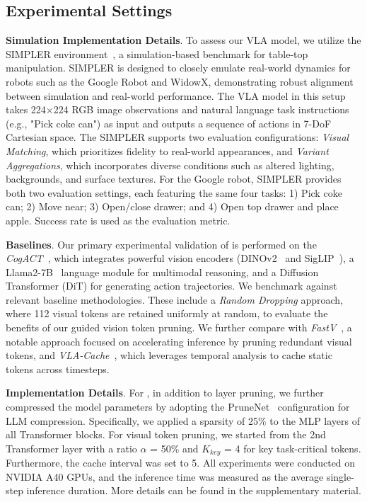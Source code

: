 \subsection{Experimental Settings}
\label{sec:setting}
\noindent \textbf{Simulation Implementation Details}.
To assess our VLA model, we utilize the SIMPLER environment~\citep{li2024evaluating}, a simulation-based benchmark for table-top manipulation. SIMPLER is designed to closely emulate real-world dynamics for robots such as the Google Robot and WidowX, demonstrating robust alignment between simulation and real-world performance.
The VLA model in this setup takes 224$\times$224 RGB image observations and natural language task instructions (e.g., "Pick coke can") as input and outputs a sequence of actions in 7-DoF Cartesian space.
The SIMPLER supports two evaluation configurations: \emph{Visual Matching}, which prioritizes fidelity to real-world appearances, and \emph{Variant Aggregations}, which incorporates diverse conditions such as altered lighting, backgrounds, and surface textures. For the Google robot, SIMPLER provides both two evaluation settings, each featuring the same four tasks: 1) Pick coke can; 2) Move near; 3) Open/close drawer; and 4) Open top drawer and place apple. Success rate is used as the evaluation metric.

\noindent \textbf{Baselines}. Our primary experimental validation of \mymethod{} is performed on the \emph{CogACT}~\citep{li2024cogactfoundationalvisionlanguageactionmodel}, which integrates powerful vision encoders (DINOv2~\citep{oquab2023dinov2} and SigLIP~\citep{zhai2023sigmoid}), a Llama2-7B~\citep{touvron2023llama} language module for multimodal reasoning, and a Diffusion Transformer (DiT) for generating action trajectories. We benchmark against relevant baseline methodologies. These include a \emph{Random Dropping} approach, where 112 visual tokens are retained uniformly at random, to evaluate the benefits of our guided vision token pruning. We further compare with \emph{FastV}~\citep{chen2025image}, a notable approach focused on accelerating inference by pruning redundant visual tokens, and \emph{VLA-Cache}~\citep{xu2025vla}, which leverages temporal analysis to cache static tokens across timesteps.

\noindent \textbf{Implementation Details}.
For \mymethod{}, in addition to layer pruning, we further compressed the model parameters by adopting the PruneNet~\citep{prunenet} configuration for LLM compression. Specifically, we applied a sparsity of 25\% to the MLP layers of all Transformer blocks. For visual token pruning, we started from the 2nd Transformer layer with a ratio $\alpha$ = 50\% and $K_{key}$ = 4 for key task-critical tokens. Furthermore, the cache interval was set to 5. All experiments were conducted on NVIDIA A40 GPUs, and the inference time was measured as the average single-step inference duration. More details can be found in the supplementary material.



